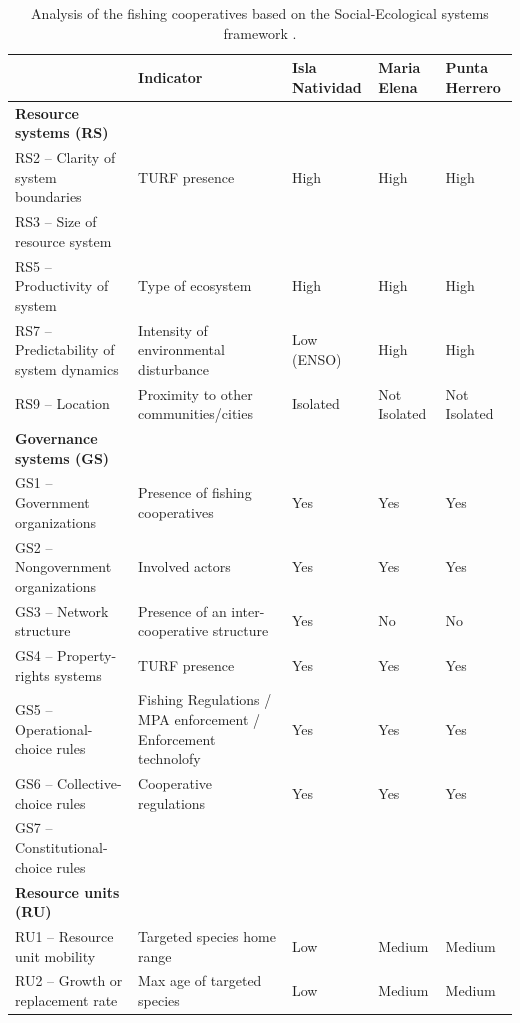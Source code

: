 \documentclass{frontiersSCNS}
\theoremstyle{definition}
\theoremstyle{definition}
\theoremstyle{definition}
\theoremstyle{remark}
\begin{document}
\begin{table}

\caption{\label{tab:unnamed-chunk-9}\label{table:gov_res}Analysis of the fishing cooperatives based on the Social-Ecological systems framework \citep{mcginnis_2014}.}
\centering
\begin{tabular}[t]{>{\raggedright\arraybackslash}p{10em}|>{\raggedright\arraybackslash}p{10em}|l|l|l}
\hline
 & Indicator & Isla Natividad & Maria Elena & Punta Herrero\\
\hline
\textbf{Resource systems (RS)} & \textbf{} & \textbf{} & \textbf{}\\
\hline
RS2 – Clarity of system boundaries & TURF presence & High & High & High\\
\hline
RS3 – Size of resource system &  &  &  & \\
\hline
RS5 – Productivity of system & Type of ecosystem & High & High & High\\
\hline
RS7 – Predictability of system dynamics & Intensity of environmental disturbance & Low (ENSO) & High & High\\
\hline
RS9 – Location & Proximity to other communities/cities & Isolated & Not Isolated & Not Isolated\\
\hline
\textbf{Governance systems (GS)} & \textbf{} & \textbf{} & \textbf{}\\
\hline
GS1 – Government organizations & Presence of fishing cooperatives & Yes & Yes & Yes\\
\hline
GS2 – Nongovernment organizations & Involved actors & Yes & Yes & Yes\\
\hline
GS3 – Network structure & Presence of an inter-cooperative structure & Yes & No & No\\
\hline
GS4 – Property-rights systems & TURF presence & Yes & Yes & Yes\\
\hline
GS5 – Operational-choice rules & Fishing Regulations / MPA enforcement / Enforcement technolofy & Yes & Yes & Yes\\
\hline
GS6 – Collective-choice rules & Cooperative regulations & Yes & Yes & Yes\\
\hline
GS7 – Constitutional-choice rules &  &  &  & \\
\hline
\textbf{Resource units (RU)} & \textbf{} & \textbf{} & \textbf{}\\
\hline
RU1 – Resource unit mobility & Targeted species home range & Low & Medium & Medium\\
\hline
RU2 – Growth or replacement rate & Max age of targeted species & Low & Medium & Medium\\

\end{tabular}
\end{table}
\end{document}
